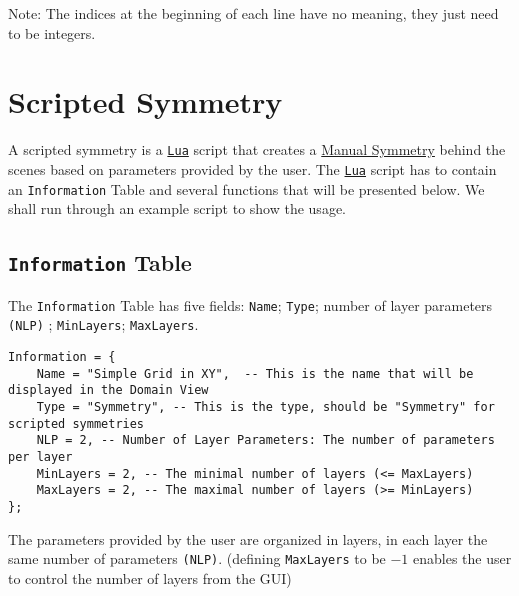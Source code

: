 \documentclass[../D+Manual.tex]{subfiles}
\begin{document}
Note: The indices at the beginning of each line have no meaning, they just need to be integers.

\section{Scripted Symmetry}
\label{sec:ScriptedSymmetry}

\lstset{style=Luastyle,}

A scripted symmetry is a \href{http://www.lua.org/}{\texttt{Lua}} script that creates a \hyperref [sec:ManualSymmetry] {Manual Symmetry} behind the scenes based on parameters provided by the user.
The \href{http://www.lua.org/}{\texttt{Lua}} script has to contain an \lstinline|Information| Table and several functions that will be presented below.
We shall run through an example script to show the usage.

\subsection{\lstinline|Information| Table}
\begin{sloppypar}
The \lstinline|Information| Table has five fields: \lstinline|Name|; \lstinline|Type|; number of layer parameters \lstinline|(NLP)| ; \lstinline|MinLayers|; \lstinline|MaxLayers|. 
\end{sloppypar}

\begin{lstlisting}[basicstyle = \small]
Information = {
    Name = "Simple Grid in XY",  -- This is the name that will be displayed in the Domain View
    Type = "Symmetry", -- This is the type, should be "Symmetry" for scripted symmetries
    NLP = 2, -- Number of Layer Parameters: The number of parameters per layer
    MinLayers = 2, -- The minimal number of layers (<= MaxLayers)
    MaxLayers = 2, -- The maximal number of layers (>= MinLayers)
};
\end{lstlisting}

The parameters provided by the user are organized in layers, in each layer the same number of parameters \lstinline|(NLP)|. (defining  \lstinline|MaxLayers| to be $-1$ enables the user to control the number of layers from the GUI)
\end{document}
